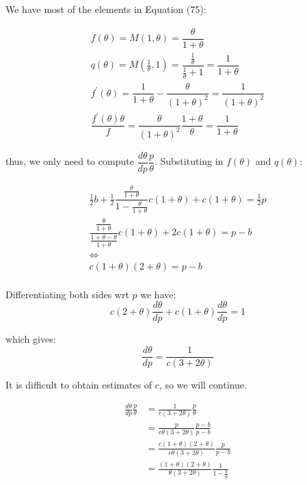 \documentclass[11pt]{article}
\begin{document}
We have most of the elements in Equation (75):

\begin{gather}
    f(\theta) = M(1,\theta) = \dfrac{\theta}{1+\theta} \\
    q(\theta) = M(\frac{1}{\theta},1) = \dfrac{\frac{1}{\theta}}{\frac{1}{\theta}+1} = \dfrac{1}{1+\theta} \\
    f^\prime(\theta) = \dfrac{1}{1+\theta}-\dfrac{\theta}{(1+\theta)^2}=\dfrac{1}{(1+\theta)^2}\\
    \dfrac{f^\prime(\theta)\theta}{f}= \dfrac{\theta}{(1+\theta)^2}\dfrac{1+\theta}{\theta} = \dfrac{1}{1+\theta}
\end{gather}

thus, we only need to compute $\dfrac{d\theta}{dp}\dfrac{p}{\theta}$. Substituting in $f(\theta)$ and $q(\theta)$:

\begin{equation}
\begin{gathered}
 \frac{1}{2} b+\frac{1}{2} \dfrac{\frac{\theta}{1+\theta}}{1-\frac{\theta}{1+\theta}} c(1+\theta)+c(1+\theta)=\frac{1}{2} p \\
 \dfrac{\frac{\theta}{1+\theta}}{\frac{1+\theta-\theta}{1+\theta}} c(1+\theta)+2 c(1+\theta)=p-b \\
  \Longleftrightarrow \\
 c(1+\theta)(2+\theta)=p-b \\
\end{gathered}
\end{equation} 

Differentiating both sides wrt $p$ we have:
\[c(2+\theta) \dfrac{d\theta}{dp} + c(1+\theta)\dfrac{d\theta}{dp} = 1\]

which gives:
\[\dfrac{d\theta}{dp}=\dfrac{1}{c(3+2\theta)}\]


\begin{note}
It is difficult to obtain estimates of $c$, so we will continue.
\end{note}


\begin{equation}
\begin{aligned}
\frac{d \theta}{d p} \frac{p}{\theta} & =\frac{1}{c(3+2 \theta)} \frac{p}{\theta} \\
& =\frac{p}{c \theta(3+2 \theta)} \frac{p-b}{p-b} \\
& =\frac{c(1+\theta)(2+\theta)}{c \theta(3+2 \theta)} \frac{p}{p-b} \\
& =\frac{(1+\theta)(2+\theta)}{\theta(3+2 \theta)} \frac{1}{1-\frac{b}{p}}
\end{aligned}
\end{equation}
\end{document}
